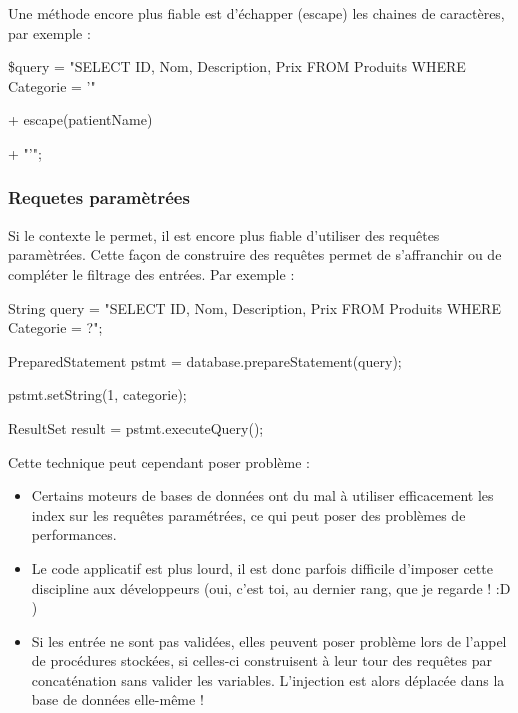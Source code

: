 Une méthode encore plus fiable est d'échapper (escape) les chaines de caractères, par exemple : 
\begin{tabbing}
\end{tabbing}

\$query =  "SELECT ID, Nom, Description, Prix FROM Produits WHERE Categorie = '"

+ escape(patientName)

+ "'";

\subsubsection{Requetes paramètrées}\label{vulnerabilites:web:sqli:countermeasures:parameterized}

Si le contexte le permet, il est encore plus fiable d'utiliser des requêtes paramètrées. Cette façon de construire des requêtes permet de s'affranchir ou de compléter le filtrage des entrées. Par exemple :
\begin{tabbing}
\end{tabbing}
String query = "SELECT ID, Nom, Description, Prix FROM Produits WHERE Categorie = ?";

PreparedStatement pstmt = database.prepareStatement(query);

pstmt.setString(1, categorie);

ResultSet result = pstmt.executeQuery();

\begin{tabbing}
\end{tabbing}

Cette technique peut cependant poser problème :
\begin{tabbing}
\end{tabbing}
\begin{itemize}
\item Certains moteurs de bases de données ont du mal à utiliser efficacement les index sur les requêtes paramétrées, ce qui peut poser des problèmes de performances.
\item Le code applicatif est plus lourd, il est donc parfois difficile d'imposer cette discipline aux développeurs (oui, c'est toi, au dernier rang, que je regarde ! :D )
\item Si les entrée ne sont pas validées, elles peuvent poser problème lors de l'appel de procédures stockées, si celles-ci construisent à leur tour des requêtes par concaténation sans valider les variables. L'injection est alors déplacée dans la base de données elle-même !
\end{itemize}

